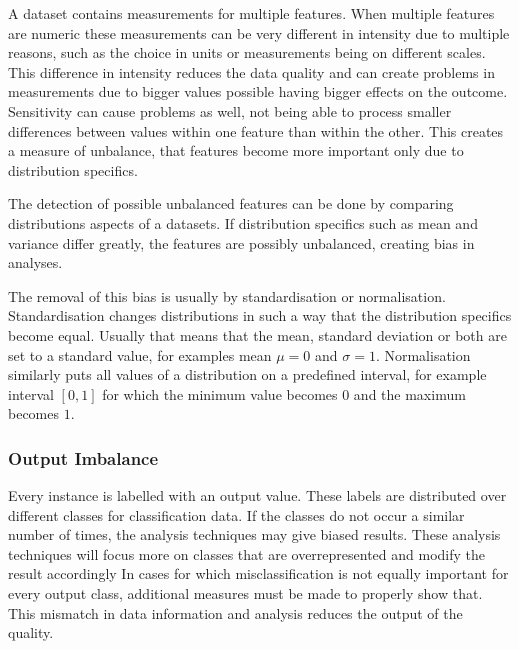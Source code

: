 \documentclass[10pt,a4paper]{report}
\begin{document}
	A dataset contains measurements for multiple features. When multiple features are numeric these measurements can be very different in intensity due to multiple reasons, such as the choice in units or measurements being on different scales. This difference in intensity reduces the data quality and can create problems in measurements due to bigger values possible having bigger effects on the outcome. Sensitivity can cause problems as well, not being able to process smaller differences between values within one feature than within the other. This creates a measure of unbalance, that features become more important only due to distribution specifics\cite{al2006normalization, patro2015normalization}. 
	
	The detection of possible unbalanced features can be done by comparing distributions aspects of a datasets. If distribution specifics such as mean and variance differ greatly, the features are possibly unbalanced, creating bias in analyses. 
	
	The removal of this bias is usually by standardisation or normalisation. Standardisation changes distributions in such a way that the distribution specifics become equal. Usually that means that the mean, standard deviation or both are set to a standard value, for examples mean $\mu = 0$ and $\sigma = 1$. Normalisation similarly puts all values of a distribution on a predefined interval, for example interval $[0, 1]$ for which the minimum value becomes $0$ and the maximum becomes $1$\cite{al2006normalization, patro2015normalization}. 
	
	\subsubsection{Output Imbalance}
	\label{DEsubsec:OutputImbalance}
	
	Every instance is labelled with an output value. These labels are distributed over different classes for classification data. If the classes do not occur a similar number of times, the analysis techniques may give biased results. These analysis techniques will focus more on classes that are overrepresented and modify the result accordingly In cases for which misclassification is not equally important for every output class, additional measures must be made to properly show that. This mismatch in data information and analysis reduces the output of the quality.
	
\end{document}
